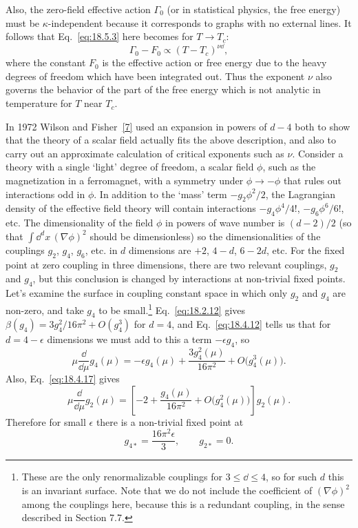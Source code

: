 Also, the zero-field effective action $\Gamma_0$ (or in statistical physics, the free energy) must be $\kappa$-independent because it corresponds to graphs with no external lines. It follows that Eq.~\eqref{eq:18.5.3} here becomes for $T\to T_c$:
\begin{equation}
\Gamma_0-F_0\propto(T-T_c)^{\nu \dd},
\tag{18.5.6}\label{eq:18.5.6}
\end{equation}
where the constant $F_0$ is the effective action or free energy due to the heavy degrees of freedom which have been integrated out. Thus the exponent $\nu$ also governs the behavior of the part of the free energy which is not analytic in temperature for $T$ near $T_c$.

In 1972 Wilson and Fisher~\hyperref[ch18-ref-7]{[7]} used an expansion in powers of $d-4$ both to show that the theory of a scalar field actually fits the above description, and also to carry out an approximate calculation of critical exponents such as $\nu$. Consider a theory with a single `light' degree of freedom, a scalar field $\phi$, such as the magnetization in a ferromagnet, with a symmetry under $\phi\to-\phi$ that rules out interactions odd in $\phi$. In addition to the `mass' term $-g_2\phi^2/2$, the Lagrangian density of the effective field theory will contain interactions $-g_4\phi^4/4!$, $-g_6\phi^6/6!$, etc. The dimensionality of the field $\phi$ in powers of wave number is $(d-2)/2$ (so that $\int \dd^dx\,(\nabla\phi)^2$ should be dimensionless) so the dimensionalities of the couplings $g_2$, $g_4$, $g_6$, etc. in $d$ dimensions are $+2$, $4-d$, $6-2d$, etc. For the fixed point at zero coupling in three dimensions, there are two relevant couplings, $g_2$ and $g_4$, but this conclusion is changed by interactions at non-trivial fixed points. Let's examine the surface in coupling constant space in which only $g_2$ and $g_4$ are non-zero, and take $g_4$ to be small.\footnote{These are the only renormalizable couplings for $3\le \dd\le4$, so for such $d$ this is an invariant surface. Note that we do not include the coefficient of $(\nabla\phi)^2$ among the couplings here, because this is a redundant coupling, in the sense described in Section 7.7.} Eq.~\eqref{eq:18.2.12} gives $\beta(g_4)=3g_4^2/16\pi^2+O(g_4^3)$ for $d=4$, and Eq.~\eqref{eq:18.4.12} tells us that for $d=4-\epsilon$ dimensions we must add to this a term $-\epsilon g_4$, so
\begin{equation}
\mu\frac{\dd}{\dd\mu}g_4(\mu)=-\epsilon g_4(\mu)
+\frac{3g_4^2(\mu)}{16\pi^2}+O\bigl(g_4^3(\mu)\bigr).
\tag{18.5.7}\label{eq:18.5.7}
\end{equation}
Also, Eq.~\eqref{eq:18.4.17} gives
\begin{equation}
\mu\frac{\dd}{\dd\mu}g_2(\mu)
=\left[-2+\frac{g_4(\mu)}{16\pi^2}+O\bigl(g_4^2(\mu)\bigr)\right]g_2(\mu).
\tag{18.5.8}\label{eq:18.5.8}
\end{equation}
Therefore for small $\epsilon$ there is a non-trivial fixed point at
\begin{equation}
g_{4*}=\frac{16\pi^2\epsilon}{3},\qquad g_{2*}=0.
\tag{18.5.9}\label{eq:18.5.9}
\end{equation}

